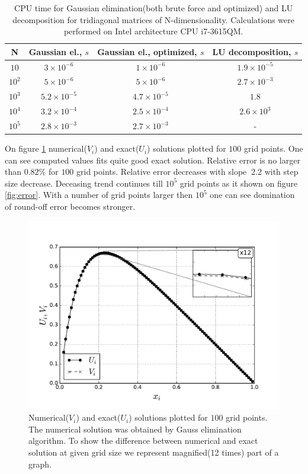 \documentclass[10pt]{article}
\begin{document}
\begin{table}
  \caption{CPU time for Gaussian elimination(both brute force and optimized) and LU decomposition for tridiagonal matrices of N-dimensionality. Calculations were performed on Intel architecture CPU i7-3615QM.}
  \label{tab:one}

  \begin{center}
    \begin{tabular}{c|c|c|c}
    \hline
        N & Gaussian el., $s$ & Gaussian el., optimized, $s$ & LU decomposition, $s$ \\
        \hline
        $10$ & $3 \times 10^{-6}$ & $1 \times 10^{-6}$ & $1.9 \times 10^{-5}$ \\
        $10^2$ & $5 \times 10^{-6}$ & $5 \times 10^{-6}$ & $2.7 \times 10^{-3}$\\
        $10^3$ & $5.2 \times 10^{-5}$ & $4.7 \times 10^{-5}$ & $1.8$\\
        $10^4$ & $3.2 \times 10^{-4}$ & $2.5 \times 10^{-4}$ & $2.6 \times 10^{3}$\\
        $10^5$ & $2.8 \times 10^{-3}$ & $2.7 \times 10^{-3}$ & -\\
    \end{tabular}
  \end{center}
\end{table}
On figure \ref{fig:gauss100} numerical($V_i$) and exact($U_i$) solutions plotted for $100$ grid points. One can see computed values fits quite good exact solution. Relative error is no larger than $0.82\%$ for $100$ grid points. Relative error decreases with slope $~2.2$ with step size decrease. Deceasing trend continues till $10^5$ grid points as it shown on figure \ref{fig:error}. With a number of grid points larger then $10^5$ one can see domination of round-off error becomes stronger.
\begin{figure}
  \begin{center}
    \includegraphics[scale=0.7]{100x100}
    \caption{Numerical($V_i$) and exact($U_i$) solutions plotted for $100$ grid points. The numerical solution was obtained by Gauss elimination algorithm. To show the difference between numerical and exact solution at given grid size we represent magnified(12 times) part of a graph.}
    \label{fig:gauss100}
  \end{center}
\end{figure}
\end{document}
